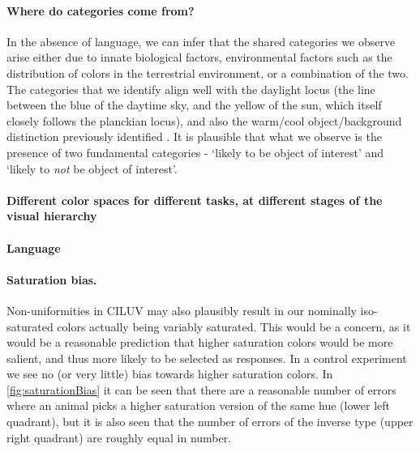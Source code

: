
\paragraph{Where do categories come from?}
In the absence of language, we can infer that the shared categories we observe arise either due to innate biological factors, environmental factors such as the distribution of colors in the terrestrial environment, or a combination of the two.
The categories that we identify align well with the daylight locus (the line between the blue of the daytime sky, and the yellow of the sun, which itself closely follows the planckian locus), and also the warm/cool object/background distinction previously identified \citep{rosenthal_color_2018}. It is plausible that what we observe is the presence of two fundamental categories - `likely to be object of interest' and `likely to \emph{not} be object of interest'. 


\paragraph{Different color spaces for different tasks, at different stages of the visual hierarchy}

\paragraph{Language}


\begin{figure}

\caption{\textbf{}}
\label{fig:SamplingBias}
\end{figure}
\paragraph{Saturation bias.}

Non-uniformities in CILUV may also plausibly result in our nominally iso-saturated colors actually being variably saturated. This would be a concern, as it would be a reasonable prediction that higher saturation colors would be more salient, and thus more likely to be selected as responses. In a control experiment we see no (or very little) bias towards higher saturation colors. In \autoref{fig:saturationBias} it can be seen that there are a reasonable number of errors where an animal picks a higher saturation version of the same hue (lower left quadrant), but it is also seen that the number of errors of the inverse type (upper right quadrant) are roughly equal in number.


